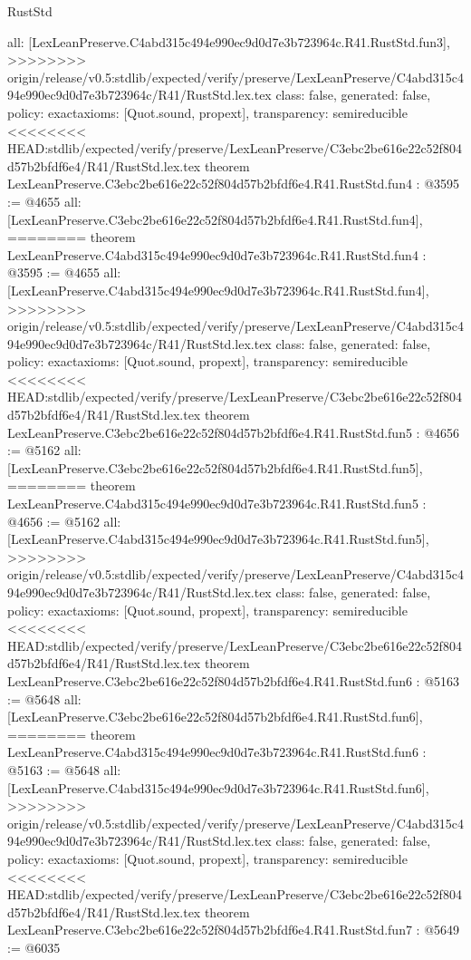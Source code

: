 \begin{lexlean}{RustStd}
\begin{coremodule}
{\begin{coremodule}
{{{{{{{  all: [LexLeanPreserve.C4abd315c494e990ec9d0d7e3b723964c.R41.RustStd.fun3],
>>>>>>>> origin/release/v0.5:stdlib/expected/verify/preserve/LexLeanPreserve/C4abd315c494e990ec9d0d7e3b723964c/R41/RustStd.lex.tex
  class: false,
  generated: false,
  policy: exact{axioms: [Quot.sound, propext]},
  transparency: semireducible
}
<<<<<<<< HEAD:stdlib/expected/verify/preserve/LexLeanPreserve/C3ebc2be616e22c52f804d57b2bfdf6e4/R41/RustStd.lex.tex
theorem LexLeanPreserve.C3ebc2be616e22c52f804d57b2bfdf6e4.R41.RustStd.fun4 : @3595 := @4655 {
  all: [LexLeanPreserve.C3ebc2be616e22c52f804d57b2bfdf6e4.R41.RustStd.fun4],
========
theorem LexLeanPreserve.C4abd315c494e990ec9d0d7e3b723964c.R41.RustStd.fun4 : @3595 := @4655 {
  all: [LexLeanPreserve.C4abd315c494e990ec9d0d7e3b723964c.R41.RustStd.fun4],
>>>>>>>> origin/release/v0.5:stdlib/expected/verify/preserve/LexLeanPreserve/C4abd315c494e990ec9d0d7e3b723964c/R41/RustStd.lex.tex
  class: false,
  generated: false,
  policy: exact{axioms: [Quot.sound, propext]},
  transparency: semireducible
}
<<<<<<<< HEAD:stdlib/expected/verify/preserve/LexLeanPreserve/C3ebc2be616e22c52f804d57b2bfdf6e4/R41/RustStd.lex.tex
theorem LexLeanPreserve.C3ebc2be616e22c52f804d57b2bfdf6e4.R41.RustStd.fun5 : @4656 := @5162 {
  all: [LexLeanPreserve.C3ebc2be616e22c52f804d57b2bfdf6e4.R41.RustStd.fun5],
========
theorem LexLeanPreserve.C4abd315c494e990ec9d0d7e3b723964c.R41.RustStd.fun5 : @4656 := @5162 {
  all: [LexLeanPreserve.C4abd315c494e990ec9d0d7e3b723964c.R41.RustStd.fun5],
>>>>>>>> origin/release/v0.5:stdlib/expected/verify/preserve/LexLeanPreserve/C4abd315c494e990ec9d0d7e3b723964c/R41/RustStd.lex.tex
  class: false,
  generated: false,
  policy: exact{axioms: [Quot.sound, propext]},
  transparency: semireducible
}
<<<<<<<< HEAD:stdlib/expected/verify/preserve/LexLeanPreserve/C3ebc2be616e22c52f804d57b2bfdf6e4/R41/RustStd.lex.tex
theorem LexLeanPreserve.C3ebc2be616e22c52f804d57b2bfdf6e4.R41.RustStd.fun6 : @5163 := @5648 {
  all: [LexLeanPreserve.C3ebc2be616e22c52f804d57b2bfdf6e4.R41.RustStd.fun6],
========
theorem LexLeanPreserve.C4abd315c494e990ec9d0d7e3b723964c.R41.RustStd.fun6 : @5163 := @5648 {
  all: [LexLeanPreserve.C4abd315c494e990ec9d0d7e3b723964c.R41.RustStd.fun6],
>>>>>>>> origin/release/v0.5:stdlib/expected/verify/preserve/LexLeanPreserve/C4abd315c494e990ec9d0d7e3b723964c/R41/RustStd.lex.tex
  class: false,
  generated: false,
  policy: exact{axioms: [Quot.sound, propext]},
  transparency: semireducible
}
<<<<<<<< HEAD:stdlib/expected/verify/preserve/LexLeanPreserve/C3ebc2be616e22c52f804d57b2bfdf6e4/R41/RustStd.lex.tex
theorem LexLeanPreserve.C3ebc2be616e22c52f804d57b2bfdf6e4.R41.RustStd.fun7 : @5649 := @6035 {
}}}}}}}}}}
\end{coremodule}}
\end{coremodule}
\end{lexlean}
